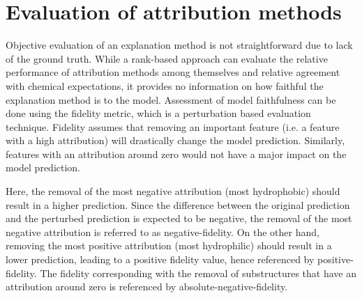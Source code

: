 \section{Evaluation of attribution methods}


Objective evaluation of an explanation method is not straightforward due to lack
of the ground truth. While a rank-based approach can evaluate the relative performance of attribution methods among 
themselves and relative agreement with chemical expectations, it provides no information on how faithful the 
explanation method is to the model. Assessment of model faithfulness can be done using the 
fidelity metric, which is a perturbation based evaluation technique.\cite{yuan2022explainability} 
Fidelity assumes that removing an important feature (i.e. a feature with a high attribution) will 
drastically change the model prediction. Similarly, features with an attribution around zero 
would not have a major impact on the model prediction.


Here, the removal of the most negative attribution (most hydrophobic) should result 
in a higher prediction. Since the difference between the original prediction and 
the perturbed prediction is expected to be negative, the removal of the most negative 
attribution is referred to as negative-fidelity. On the other hand, removing the most 
positive attribution (most hydrophilic) should result in a lower prediction, leading to a positive fidelity 
value, hence referenced by positive-fidelity. The fidelity corresponding with the removal 
of substructures that have an attribution around zero is referenced by absolute-negative-fidelity.
